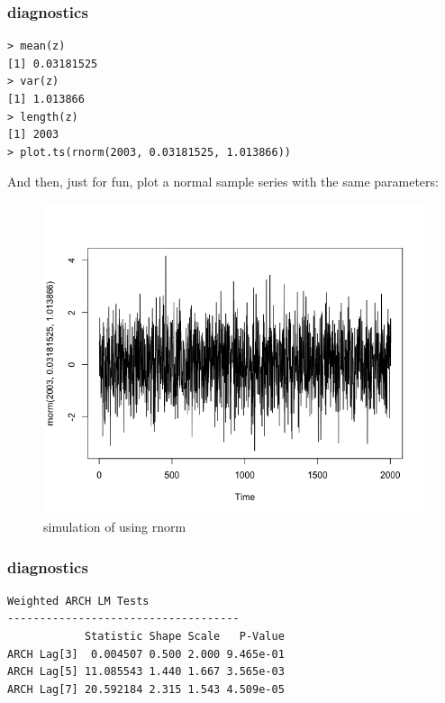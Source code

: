 \documentclass[9pt]{beamer}
\begin{document}
\begin{frame}[fragile]
\frametitle{diagnostics}
\begin{verbatim}
> mean(z)
[1] 0.03181525
> var(z)
[1] 1.013866
> length(z)
[1] 2003
> plot.ts(rnorm(2003, 0.03181525, 1.013866))
\end{verbatim} 
\indent And then, just for fun, plot a normal sample series with the same parameters:

\begin{figure}[H]
\centering
\caption{simulation of using rnorm}
\includegraphics[scale=.20]{rnorm.png}
\end{figure}
\end{frame}



\begin{frame}[fragile]
\frametitle{diagnostics}
\begin{verbatim}
Weighted ARCH LM Tests
------------------------------------
            Statistic Shape Scale   P-Value
ARCH Lag[3]  0.004507 0.500 2.000 9.465e-01
ARCH Lag[5] 11.085543 1.440 1.667 3.565e-03
ARCH Lag[7] 20.592184 2.315 1.543 4.509e-05
\end{verbatim}
\end{frame}
\end{document}
